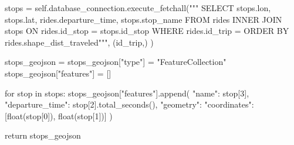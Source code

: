 \begin{code}[frame=none]
stops = self.database_connection.execute_fetchall("""
SELECT
  stops.lon,
  stops.lat,
  rides.departure_time,
  stops.stop_name
FROM rides
INNER JOIN stops ON rides.id_stop = stops.id_stop
WHERE rides.id_trip = %
ORDER BY rides.shape_dist_traveled""",
(id_trip,)
)


stops_geojson = {}
stops_geojson["type"] = "FeatureCollection"
stops_geojson["features"] = []


for stop in stops:
stops_geojson["features"].append({
  "name": stop[3],
  "departure_time": stop[2].total_seconds(),
  "geometry": {
    "coordinates": [float(stop[0]), float(stop[1])]
  }
})


return stops_geojson
\end{code}








































 
